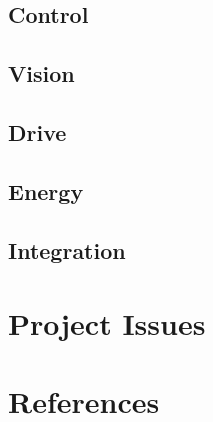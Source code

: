 \documentclass[11pt, a4paper]{article}
\begin{document}
\subsection{Control}



\subsection{Vision}




\subsection{Drive}




\subsection{Energy}




\subsection{Integration}




\pagebreak
\section{Project Issues}




\pagebreak
\section{References}
\end{document}
